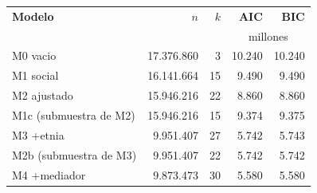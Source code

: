 \begin{tabular}{lrrrr}
\toprule
\textbf{Modelo} & \textbf{$n$} & \textbf{$k$} & \textbf{AIC} & \textbf{BIC} \\
 & & & \multicolumn{2}{c}{\footnotesize millones} \\
\midrule
M0 vacio & 17.376.860 & 3 & 10.240 & 10.240 \\
M1 social & 16.141.664 & 15 & 9.490 & 9.490 \\
M2 ajustado & 15.946.216 & 22 & 8.860 & 8.860 \\
M1c (submuestra de M2) & 15.946.216 & 15 & 9.374 & 9.375 \\
M3 +etnia & 9.951.407 & 27 & 5.742 & 5.743 \\
M2b (submuestra de M3) & 9.951.407 & 22 & 5.742 & 5.742 \\
M4 +mediador & 9.873.473 & 30 & 5.580 & 5.580 \\
\bottomrule
\end{tabular}
